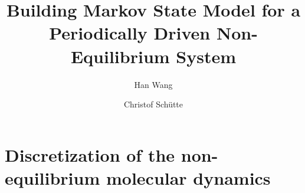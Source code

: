 \documentclass[aip,jcp,preprint,unsortedaddress,a4paper,onecolumn]{revtex4-1}
\begin{document}
\title{Building Markov State Model for a Periodically Driven Non-Equilibrium System}
\author{Han Wang}
\author{Christof Sch\"utte}
   
\begin{abstract}
\end{abstract}

\maketitle

\section{Discretization of the non-equilibrium molecular dynamics}
\end{document}

